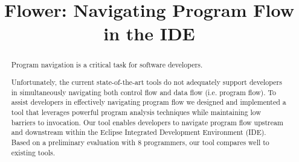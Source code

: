 \documentclass[conference]{IEEEtran}
\newcommand{\toolName}{Flower}
\begin{document}
%
\title{\toolName: Navigating Program Flow in the IDE}


\author{
}

\maketitle

\begin{abstract}
Program navigation is a critical task for software developers. 

%

Unfortunately, the current state-of-the-art tools do not adequately support developers in simultaneously navigating both control flow and data flow (i.e. program flow). 
To assist developers in effectively navigating program flow we designed and implemented a tool that leverages powerful program analysis techniques while maintaining low barriers to invocation.
Our tool enables developers to navigate program flow upstream and downstream within the Eclipse Integrated Development Environment (IDE).
Based on a preliminary evaluation with 8 programmers, our tool compares well to existing tools. 
\end{abstract}
\end{document}
